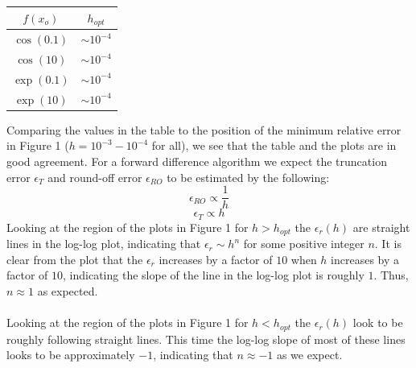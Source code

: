 \documentclass[12pt,letterpaper]{article}
\begin{document}
\begin{table}[h]
	\centering
	\begin{tabular}[h]{| c | c |}
		\hline
		$f(x_{o})$	&	$h_{opt}$ \\ \hline \hline
		$\cos(0.1)$	&	$\sim 10^{-4}$	\\ \hline
		$\cos(10)$ &	$\sim 10^{-4}$	\\ \hline
		$\exp(0.1)$	& 	$\sim 10^{-4}$	\\ \hline
		$\exp(10)$	&	$\sim 10^{-4}$	\\ \hline
	\end{tabular}
\end{table}
	
Comparing the values in the table to the position of the minimum relative error in Figure 1 ($h=10^{-3}-10^{-4}$ for all), we see that the table and the plots are in good agreement. For a forward difference algorithm we expect the truncation error $\epsilon_{T}$ and round-off error $\epsilon_{RO}$ to be estimated by the following:
\begin{equation}
	\epsilon_{RO} \propto \frac{1}{h}
\end{equation}
\begin{equation}
	\epsilon_{T} \propto h
\end{equation}
Looking at the region of the plots in Figure 1 for $h>h_{opt}$ the $\epsilon_{r}(h)$ are straight lines in the log-log plot, indicating that $\epsilon_{r} \sim h^{n}$ for some positive integer $n$. It is clear from the plot that the $\epsilon_{r}$ increases by a factor of $10$ when $h$ increases by a factor of $10$, indicating the slope of the line in the log-log plot is roughly $1$. Thus, $n\approx 1$ as expected.\\\\

Looking at the region of the plots in Figure 1 for $h<h_{opt}$ the $\epsilon_{r}(h)$ look to be roughly following straight lines. This time the log-log slope of most of these lines looks to be approximately $-1$, indicating that $n\approx-1$ as we expect.\\ 
\end{document}
